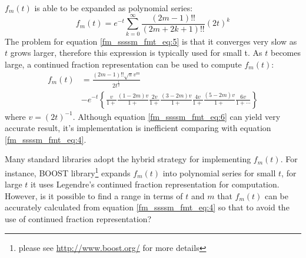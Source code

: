 $f_{m}(t)$ is able to be expanded as polynomial series:
\begin{equation}
 \label{fm_ssssm_fmt_eq:5}
 f_{m}(t) = e^{-t}\sum_{k=0}^{\infty}\frac{(2m-1)!!}{(2m+2k+1)!!}
 (2t)^{k}
\end{equation}
The problem for equation \ref{fm_ssssm_fmt_eq:5} is that it converges very slow as $t$
grows larger, therefore this expression is typically used for small t. As $t$ becomes large,
a continued fraction representation can be used to compute $f_{m}(t)$\cite{harris1983sssm}:
\begin{equation}
\begin{split}
f_{m}(t) &= \frac{(2m-1)!!\sqrt{\pi}v^{m}}{2t^{\frac{1}{2}}} \\
         &- e^{-t}
         \left\lbrace 
         \frac{v}{1+}\frac{(1-2m)v}{1+}\frac{2v}{1+}\frac{(3-2m)v}{1+}\frac{4v}{1+}
         \frac{(5-2m)v}{1+}\frac{6v}{1+\cdots}
         \right\rbrace 
\end{split}
\label{fm_ssssm_fmt_eq:6}
\end{equation}
where $v = (2t)^{-1}$. Although equation \ref{fm_ssssm_fmt_eq:6} can yield very accurate
result, it's implementation is inefficient comparing with equation \ref{fm_ssssm_fmt_eq:4}.

Many standard libraries adopt the hybrid strategy for implementing $f_{m}(t)$. For instance,
BOOST library\footnote{please see \url{http://www.boost.org/} for more details} expands 
$f_{m}(t)$ into polynomial series for small $t$, for large $t$ it uses
Legendre's continued fraction representation for computation. However, is it possible 
to find a range in terms of $t$ and $m$ that $f_{m}(t)$ can be accurately calculated from
equation \ref{fm_ssssm_fmt_eq:4} so that to avoid the use of continued fraction representation?


